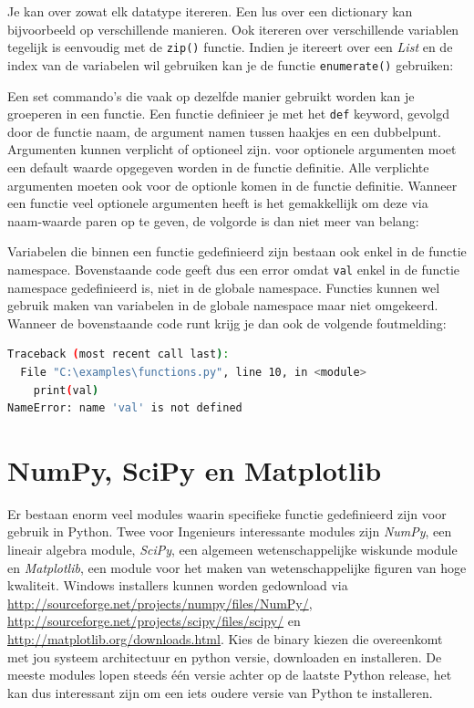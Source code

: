 \documentclass[11pt,twoside]{article}
\begin{document}
Je kan over zowat elk datatype itereren. Een lus over een dictionary kan bijvoorbeeld op verschillende manieren. Ook itereren over verschillende variablen tegelijk is eenvoudig met de \lstinline{zip()} functie. Indien je itereert over een \emph{List} en de index van de variabelen wil gebruiken kan je de functie \lstinline{enumerate()} gebruiken:


Een set commando's die vaak op dezelfde manier gebruikt worden kan je groeperen in een functie. Een functie definieer je met het \lstinline{def} keyword, gevolgd door de functie naam, de argument namen tussen haakjes en een dubbelpunt. Argumenten kunnen verplicht of optioneel zijn. voor optionele argumenten moet een default waarde opgegeven worden in de functie definitie. Alle verplichte argumenten moeten ook voor de optionle komen in de functie definitie. Wanneer een functie veel optionele argumenten heeft is het gemakkellijk om deze via naam-waarde paren op te geven, de volgorde is dan niet meer van belang:

Variabelen die binnen een functie gedefinieerd zijn bestaan ook enkel in de functie namespace. Bovenstaande code geeft dus een error omdat \lstinline{val} enkel in de functie namespace gedefinieerd is, niet in de globale namespace. Functies kunnen wel gebruik maken van variabelen in de globale namespace maar niet omgekeerd. Wanneer de bovenstaande code runt krijg je dan ook de volgende foutmelding:
\begin{lstlisting}[language=bash]
Traceback (most recent call last):
  File "C:\examples\functions.py", line 10, in <module>
    print(val)
NameError: name 'val' is not defined
\end{lstlisting}

	\section{NumPy, SciPy en Matplotlib} 
Er bestaan enorm veel modules waarin specifieke functie gedefinieerd zijn voor gebruik in Python. Twee voor Ingenieurs interessante modules zijn \emph{NumPy}, een lineair algebra module, \emph{SciPy}, een algemeen wetenschappelijke wiskunde module en \emph{Matplotlib}, een module voor het maken van wetenschappelijke figuren van hoge kwaliteit. Windows installers kunnen worden gedownload via \url{http://sourceforge.net/projects/numpy/files/NumPy/}, \url{http://sourceforge.net/projects/scipy/files/scipy/} en \url{http://matplotlib.org/downloads.html}. Kies de binary kiezen die overeenkomt met jou systeem architectuur en python versie, downloaden en installeren. De meeste modules lopen steeds één versie achter op de laatste Python release, het kan dus interessant zijn om een iets oudere versie van Python te installeren.
\end{document}
